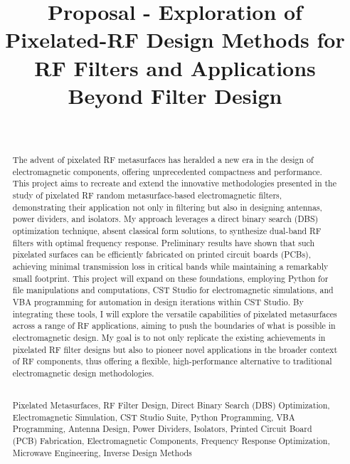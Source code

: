 \documentclass[journal]{IEEEtran}
\begin{document}
\title{Proposal - Exploration of Pixelated-RF Design Methods for RF Filters and Applications Beyond Filter Design}

\author{
    \\
    }

\maketitle

\IEEEpeerreviewmaketitle
\begin{abstract}
The advent of pixelated RF metasurfaces has heralded a new era in the design of electromagnetic components, offering unprecedented compactness and performance. This project aims to recreate and extend the innovative methodologies presented in the study of pixelated RF random metasurface-based electromagnetic filters, demonstrating their application not only in filtering but also in designing antennas, power dividers, and isolators. My approach leverages a direct binary search (DBS) optimization technique, absent classical form solutions, to synthesize dual-band RF filters with optimal frequency response. Preliminary results have shown that such pixelated surfaces can be efficiently fabricated on printed circuit boards (PCBs), achieving minimal transmission loss in critical bands while maintaining a remarkably small footprint. This project will expand on these foundations, employing Python for file manipulations and computations, CST Studio for electromagnetic simulations, and VBA programming for automation in design iterations within CST Studio. By integrating these tools, I will explore the versatile capabilities of pixelated metasurfaces across a range of RF applications, aiming to push the boundaries of what is possible in electromagnetic design. My goal is to not only replicate the existing achievements in pixelated RF filter designs but also to pioneer novel applications in the broader context of RF components, thus offering a flexible, high-performance alternative to traditional electromagnetic design methodologies.
\\\\  
\begin{IEEEkeywords}
Pixelated Metasurfaces, RF Filter Design, Direct Binary Search (DBS) Optimization, Electromagnetic Simulation, CST Studio Suite, Python Programming, VBA Programming, Antenna Design, Power Dividers, Isolators, Printed Circuit Board (PCB) Fabrication, Electromagnetic Components, Frequency Response Optimization, Microwave Engineering, Inverse Design Methods
\end{IEEEkeywords}

\end{abstract}
\end{document}
